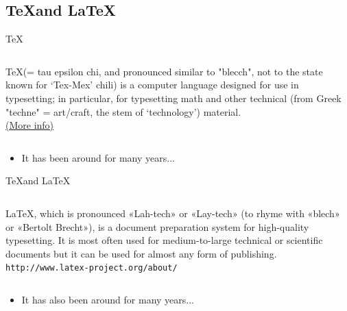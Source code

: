 \documentclass{beamer}
\begin{document}

\subsection{\TeX and \LaTeX}


\begin{frame}{\TeX}
	\begin{center}
	\begin{columns}
	\begin{block}{}
	\begin{center}
	\TeX (= tau epsilon chi, and pronounced similar to "blecch", not to the state known for `Tex-Mex' chili) is a computer language designed for use in typesetting; in particular, for typesetting math and other technical (from Greek "techne" = art/craft, the stem of `technology') material.\\
    \href{tug.org/whatis.html}{(More info)}
	\end{center}
	\end{block}
	\end{columns}
	\end{center}
	
      \begin{itemize}
	\item It has been around for many years...
      \end{itemize}
\end{frame}



\begin{frame}{\TeX and \LaTeX}
	\begin{center}
	\begin{columns}
	\column{.95\textwidth}
	\begin{block}{}
	\begin{center}
	\LaTeX, which is pronounced «Lah-tech» or «Lay-tech» (to rhyme with «blech» or «Bertolt Brecht»), is a document preparation system for high-quality typesetting. It is most often used for medium-to-large technical or scientific documents but it can be used for almost any form of publishing.\\
	\texttt{http://www.latex-project.org/about/}
	\end{center}
	\end{block}
	\end{columns}
	\end{center}
	
      \begin{itemize}
	\item It has also been around for many years...
      \end{itemize}
\end{frame}
\end{document}
